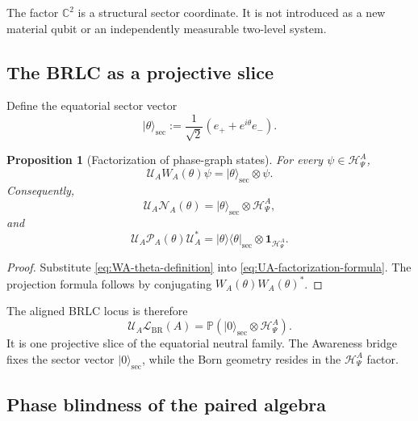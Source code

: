 \documentclass[11pt,reqno]{scrartcl}
\newcommand{\CC}{\mathbb C}
\newcommand{\idop}{\mathbf 1}
\newcommand{\ket}[1]{\lvert #1\rangle}
\newcommand{\bra}[1]{\langle #1\rvert}
\newcommand{\proj}[1]{\ket{#1}\!\bra{#1}}
\newcommand{\projective}[1]{\mathbb P\!\left(#1\right)}
\newcommand{\actHP}{\mathscr H_{\Psi}^{A}}
\newcommand{\NAtheta}{\mathscr N_{A}(\theta)}
\newcommand{\WAtheta}{W_{A}(\theta)}
\newcommand{\LBR}{\mathscr L_{\mathrm{BR}}(A)}
\newcommand{\UA}{\mathcal U_{A}}
\newcommand{\PAtheta}{\mathcal P_{A}(\theta)}
\newcommand{\eplus}{e_{+}}
\newcommand{\eminus}{e_{-}}
\theoremstyle{plain}
\newtheorem{proposition}[proposition]{Proposition}
\theoremstyle{definition}
\theoremstyle{remark}
\begin{document}
The factor \(\CC^2\) is a structural sector coordinate.  It is not introduced
as a new material qubit or an independently measurable two-level system.

\subsection{The BRLC as a projective slice}

Define the equatorial sector vector
\begin{equation}
  \ket{\theta}_{\mathrm{sec}}
  :=\frac1{\sqrt2}
    \left(\eplus+e^{i\theta}\eminus\right).
  \label{eq:sector-equator-vector}
\end{equation}

\begin{proposition}[Factorization of phase-graph states]
\label{prop:phase-graph-factorization}
For every \(\psi\in\actHP\),
\begin{equation}
  \boxed{
  \UA\WAtheta\psi
  =\ket{\theta}_{\mathrm{sec}}\otimes\psi.}
  \label{eq:WA-factorized-state}
\end{equation}
Consequently,
\begin{equation}
  \UA\NAtheta
  =\ket{\theta}_{\mathrm{sec}}\otimes\actHP,
  \label{eq:NA-factorized-subspace}
\end{equation}
and
\begin{equation}
  \UA\PAtheta\UA^*
  =\proj{\theta}_{\mathrm{sec}}\otimes\idop_{\actHP}.
  \label{eq:graph-projection-factorized}
\end{equation}
\end{proposition}

\begin{proof}
Substitute \eqref{eq:WA-theta-definition} into
\eqref{eq:UA-factorization-formula}.  The projection formula follows by
conjugating \(\WAtheta\WAtheta^*\).
\end{proof}

The aligned BRLC locus is therefore
\begin{equation}
  \UA\LBR
  =\projective{
      \ket{0}_{\mathrm{sec}}\otimes\actHP
    }.
  \label{eq:BRLC-factorized-locus}
\end{equation}
It is one projective slice of the equatorial neutral family.  The Awareness
bridge fixes the sector vector \(\ket0_{\mathrm{sec}}\), while the Born
geometry resides in the \(\actHP\) factor.

\subsection{Phase blindness of the paired algebra}
\end{document}
